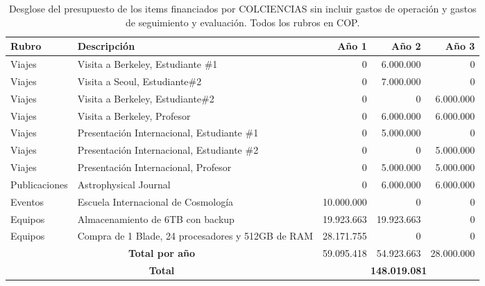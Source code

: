 \begin{table}[h]
\begin{center}
\begin{tabular}{|l|p{5.5cm}|r|r|r|}\hline
{\bf Rubro}	&{\bf Descripción}	& {\bf Año 1}	& {\bf Año 2}	& {\bf Año 3}\\\hline
Viajes	&Visita a Berkeley, Estudiante \#1	&0	&	6.000.000&0\\\hline
Viajes	&Visita a Seoul,  Estudiante\#2	&0	&7.000.000	&0\\\hline
Viajes	&Visita a Berkeley,  Estudiante\#2	&0	&0& 6.000.000 \\\hline
Viajes	&Visita a Berkeley, Profesor	&0	&6.000.000	&6.000.000\\\hline
Viajes	&Presentación Internacional, Estudiante \#1	&0	&5.000.000	&0\\\hline
Viajes	&Presentación Internacional, Estudiante \#2	&0	&0	&5.000.000\\\hline
Viajes	&Presentación Internacional, Profesor	&0	&5.000.000	&5.000.000\\\hline
Publicaciones	&Astrophysical Journal	&0	&6.000.000	&6.000.000\\\hline
Eventos	&Escuela Internacional de Cosmología	&10.000.000	&0	&0\\\hline
Equipos	&Almacenamiento de 6TB con backup 	&19.923.663	&19.923.663	&0\\\hline
Equipos	&Compra de 1 Blade, 24 procesadores y 512GB de RAM 	&28.171.755	&0	&0\\\hline
\multicolumn{2}{|c|}{{\bf Total por año}}	 & 59.095.418	&54.923.663	&28.000.000 \\\hline
\multicolumn{2}{|c|}{\bf Total } & \multicolumn{3}{|c|}{{\bf 148.019.081}}\\\hline
\end{tabular} 
\caption{Desglose del presupuesto de los items financiados por COLCIENCIAS sin incluir gastos de 
operaci\'on y gastos de seguimiento y evaluaci\'on. Todos los rubros en COP.}
\end{center}
\label{Resumen Presupuesto Colciencias}
\end{table}


